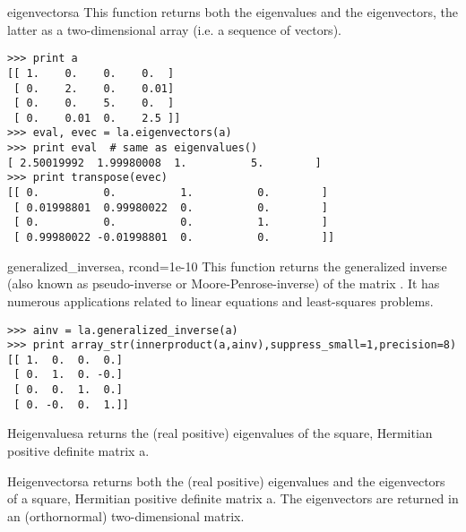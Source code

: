 \begin{funcdesc}{eigenvectors}{a}
   This function returns both the eigenvalues and the eigenvectors, the latter
   as a two-dimensional array (i.e. a sequence of vectors).
\begin{verbatim}
>>> print a
[[ 1.    0.    0.    0.  ]
 [ 0.    2.    0.    0.01]
 [ 0.    0.    5.    0.  ]
 [ 0.    0.01  0.    2.5 ]]
>>> eval, evec = la.eigenvectors(a)
>>> print eval  # same as eigenvalues()
[ 2.50019992  1.99980008  1.          5.        ]
>>> print transpose(evec)
[[ 0.          0.          1.          0.        ]
 [ 0.01998801  0.99980022  0.          0.        ]
 [ 0.          0.          0.          1.        ]
 [ 0.99980022 -0.01998801  0.          0.        ]]
\end{verbatim}
\end{funcdesc}
 
\begin{funcdesc}{generalized_inverse}{a, rcond=1e-10}
   This function returns the generalized inverse (also known as pseudo-inverse
   or Moore-Penrose-inverse) of the matrix . It has numerous 
   applications related to linear equations and least-squares problems.
\begin{verbatim}
>>> ainv = la.generalized_inverse(a)
>>> print array_str(innerproduct(a,ainv),suppress_small=1,precision=8)
[[ 1.  0.  0.  0.]
 [ 0.  1.  0. -0.]
 [ 0.  0.  1.  0.]
 [ 0. -0.  0.  1.]]
\end{verbatim}
\end{funcdesc}
 
\begin{funcdesc}{Heigenvalues}{a}
   returns the (real positive) eigenvalues of the square, Hermitian positive
   definite matrix a.
\end{funcdesc}
 
\begin{funcdesc}{Heigenvectors}{a}
   returns both the (real positive) eigenvalues and the eigenvectors of a
   square, Hermitian positive definite matrix a. The eigenvectors are returned
   in an (orthornormal) two-dimensional matrix.
\end{funcdesc}

